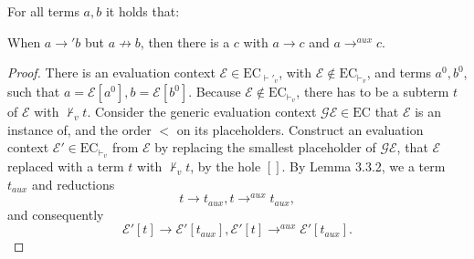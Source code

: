\begin{lemma}

For all terms $a,b$ it holds that:

When $a \longrightarrow' b$ but $a \not\longrightarrow b$, then there is a $c$ with $a \longrightarrow c$ and $a \longrightarrow^{aux} c$.

\begin{proof}

There is an evaluation context $\mathcal{E} \in \textrm{EC}_{\vdash'_v}$, with $\mathcal{E} \not\in \textrm{EC}_{\vdash_v}$, and terms $a^0, b^0$, such that $a = \mathcal{E}[a^0], b = \mathcal{E}[b^0]$. Because $\mathcal{E} \not\in \textrm{EC}_{\vdash_v}$, there has to be a subterm $t$ of $\mathcal{E}$ with $\not\vdash_v t$. Consider the generic evaluation context $\mathcal{GE} \in \textrm{EC}$ that $\mathcal{E}$ is an instance of, and the order $<$ on its placeholders. Construct an evaluation context $\mathcal{E}' \in \textrm{EC}_{\vdash_v}$ from $\mathcal{E}$ by replacing the smallest placeholder of $\mathcal{GE}$, that $\mathcal{E}$ replaced with a term $t$ with $\not\vdash_v t$, by the hole $[]$. By Lemma 3.3.2, we a term $t_{aux}$ and reductions
\[
t \longrightarrow t_{aux}, t \longrightarrow^{aux} t_{aux},
\]
and consequently
\[
\mathcal{E}'[t] \longrightarrow \mathcal{E}'[t_{aux}], \mathcal{E}'[t] \longrightarrow^{aux} \mathcal{E}'[t_{aux}].
\]

\end{proof}

\end{lemma}

